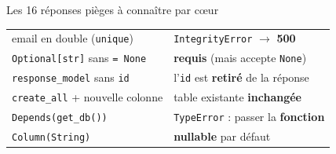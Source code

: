 \documentclass[a4paper,10pt]{article}
\newcommand{\co}[1]{\texttt{\textcolor{codefg}{#1}}}
\begin{document}
\begin{piegebox}{Les 16 réponses pièges à connaître par c\oe ur}
\begin{minipage}[t]{0.485\linewidth}
\begin{tabularx}{\linewidth}{@{}l>{\raggedright\arraybackslash}X@{}}
email en double (\co{unique}) & \co{IntegrityError} $\to$ \textbf{500} \\
\co{Optional[str]} sans \co{= None} & \textbf{requis} (mais accepte \co{None}) \\
\co{response\_model} sans \co{id} & l'\co{id} est \textbf{retiré} de la réponse \\
\co{create\_all} + nouvelle colonne & table existante \textbf{inchangée} \\
\co{Depends(get\_db())}       & \co{TypeError} : passer la \textbf{fonction} \\
\co{Column(String)}           & \textbf{nullable} par défaut \\
\bottomrule
\end{tabularx}
\end{minipage}
\end{piegebox}
\end{document}

